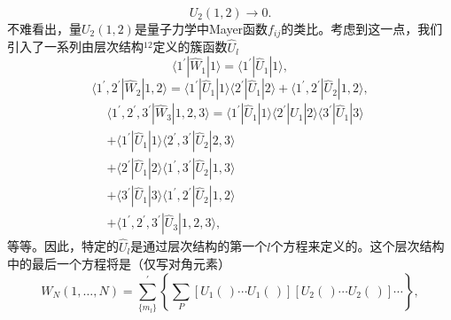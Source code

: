 \begin{equation}\tag{10.6.11}\label{eq:10.6.11}
U _ { 2 } ( 1 , 2 ) \rightarrow 0 .
\end{equation}
不难看出，量\(U_{2}(1,2)\)是量子力学中Mayer函数\(f_{ij}\)的类比。考虑到这一点，我们引入了一系列由层次结构\(^{12}\)定义的簇函数\(\hat{U}_{l}\)
\begin{equation}\tag{10.6.12}\label{eq:10.6.12}
\langle 1 ^{\prime} | \hat { W } _ { 1 } | 1 \rangle = \langle 1 ^{\prime} | \hat { U } _ { 1 } | 1 \rangle ,
\end{equation}
\begin{equation}\tag{10.6.13}\label{eq:10.6.13}
\langle 1 ^{\prime} , 2 ^{\prime} | \hat { W } _ { 2 } | 1 , 2 \rangle = \langle 1 ^{\prime} | \hat { U } _ { 1 } | 1 \rangle \langle 2 ^{\prime} | \hat { U } _ { 1 } | 2 \rangle + \langle 1 ^{\prime} , 2 ^{\prime} | \hat { U } _ { 2 } | 1 , 2 \rangle ,
\end{equation}
\begin{equation}\tag{10.6.14}\label{eq:10.6.14}
\begin{array}{rl} & { \langle 1 ^{\prime} , 2 ^{\prime} , 3 ^{\prime} | \hat { W } _ { 3 } | 1 , 2 , 3 \rangle = \langle 1 ^{\prime} | \hat { U } _ { 1 } | 1 \rangle \langle 2 ^{\prime} | \hat { U } _ { 1 } | 2 \rangle \langle 3 ^{\prime} | \hat { U } _ { 1 } | 3 \rangle } \\& {   + \langle 1 ^{\prime} | \hat { U } _ { 1 } | 1 \rangle \langle 2 ^{\prime} , 3 ^{\prime} | \hat { U } _ { 2 } | 2 , 3 \rangle } \\& {   + \langle 2 ^{\prime} | \hat { U } _ { 1 } | 2 \rangle \langle 1 ^{\prime} , 3 ^{\prime} | \hat { U } _ { 2 } | 1 , 3 \rangle } \\& {   + \langle 3 ^{\prime} | \hat { U } _ { 1 } | 3 \rangle \langle 1 ^{\prime} , 2 ^{\prime} | \hat { U } _ { 2 } | 1 , 2 \rangle } \\& {   + \langle 1 ^{\prime} , 2 ^{\prime} , 3 ^{\prime} | \hat { U } _ { 3 } | 1 , 2 , 3 \rangle , } \end{array}
\end{equation}
等等。因此，特定的\(\hat{U}_{l}\)是通过层次结构的第一个\(l\)个方程来定义的。这个层次结构中的最后一个方程将是（仅写对角元素）
\begin{equation}\tag{10.6.15}\label{eq:10.6.15}
W _ { N } ( 1 , \ldots , N ) = \sum _ { \{ m _ { l } \} } ^{\prime} \left\{ \sum _ { P } [ U _ { 1 } ( \, ) \cdots U _ { 1 } ( \, ) ] [ U _ { 2 } ( \, ) \cdots U _ { 2 } ( \, ) ] \cdots \right\} ,
\end{equation}
